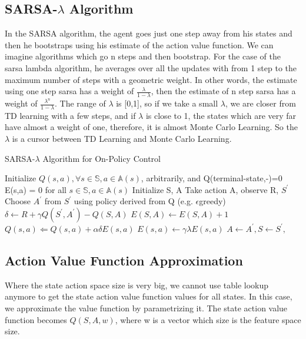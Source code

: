 \documentclass[12pt,a4paper]{article}
\begin{document}
\subsection{SARSA-$\lambda$ Algorithm}
In the SARSA algorithm, the agent goes just one step away from his states and then he bootstraps using his estimate of the action value function. We can imagine algorithms which go n steps and then bootstrap. For the case of the sarsa lambda algorithm, he averages over all the updates with from 1 step to the maximum number of steps with a geometric weight. In other words, the estimate using one step sarsa has a weight of $\frac{\lambda}{1-\lambda}$, then the estimate of n step sarsa has a weight of $\frac{\lambda^{n}}{1-\lambda}$. The range of $\lambda$ is [0,1], so if we take a small $\lambda$, we are closer from TD learning with a few steps, and if $\lambda$ is close to 1, the states which are very far have almost a weight of one, therefore, it is almost Monte Carlo Learning. So the $\lambda$ is a cursor between TD Learning and Monte Carlo Learning.

\begin{algorithm}
\caption{SARSA-$\lambda$ Algorithm for On-Policy Control}
\label{alg:sarsa_lambda}
\begin{algorithmic}[1]
\State Initialize $Q(s,a),\forall s \in \mathbb{S}, a \in \mathbb{A}(s)$, arbitrarily, and Q(terminal-state,-)=0
\State E(s,a) = 0 for all $s\in\mathbb{S}, a\in\mathbb{A}(s)$
\State Initialize S, A
\State Take action A, observe R, $S^{\prime}$
\State Choose $A^{\prime}$ from $S^{\prime}$ using policy derived from Q (e.g. $\epsilon$greedy)
\State $\delta \leftarrow R + \gamma Q(S^{\prime},A^{\prime}) - Q(S,A) $
\State $E(S,A) \leftarrow E(S,A) + 1$ 
\State $Q(s,a) \Leftarrow Q(s,a) + \alpha\delta E(s,a)$
\State $E(s,a) \leftarrow \gamma \lambda E(s,a)$
\EndFor
\State $A \leftarrow A^{\prime}, S \leftarrow S^{\prime},$
\EndFor
\EndFor
\end{algorithmic}
\end{algorithm}


\subsection{Action Value Function Approximation}
Where the state action space size is very big, we cannot use table lookup anymore to get the state action value function values for all states. In this case, we approximate the value function by parametrizing it.
The state action value function becomes $Q(S, A, w)$, where w is a vector which size is the feature space size.
\end{document}
